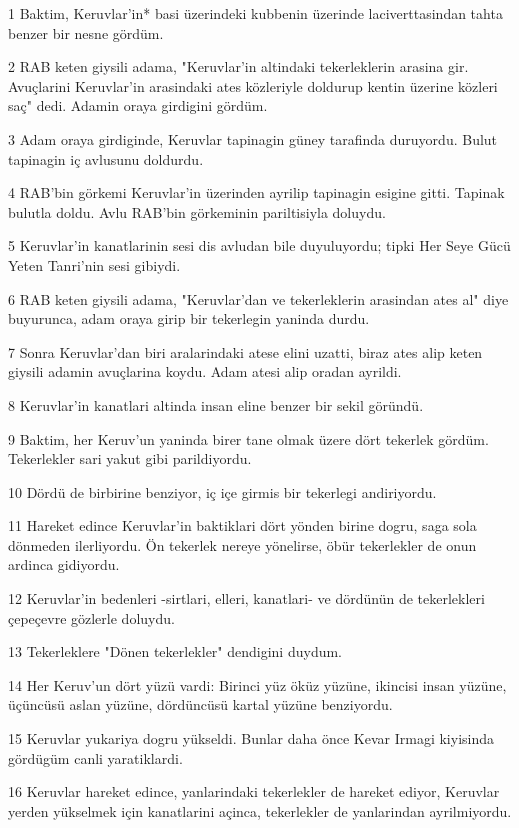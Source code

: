 \par 1 Baktim, Keruvlar'in* basi üzerindeki kubbenin üzerinde laciverttasindan tahta benzer bir nesne gördüm.
\par 2 RAB keten giysili adama, "Keruvlar'in altindaki tekerleklerin arasina gir. Avuçlarini Keruvlar'in arasindaki ates közleriyle doldurup kentin üzerine közleri saç" dedi. Adamin oraya girdigini gördüm.
\par 3 Adam oraya girdiginde, Keruvlar tapinagin güney tarafinda duruyordu. Bulut tapinagin iç avlusunu doldurdu.
\par 4 RAB'bin görkemi Keruvlar'in üzerinden ayrilip tapinagin esigine gitti. Tapinak bulutla doldu. Avlu RAB'bin görkeminin pariltisiyla doluydu.
\par 5 Keruvlar'in kanatlarinin sesi dis avludan bile duyuluyordu; tipki Her Seye Gücü Yeten Tanri'nin sesi gibiydi.
\par 6 RAB keten giysili adama, "Keruvlar'dan ve tekerleklerin arasindan ates al" diye buyurunca, adam oraya girip bir tekerlegin yaninda durdu.
\par 7 Sonra Keruvlar'dan biri aralarindaki atese elini uzatti, biraz ates alip keten giysili adamin avuçlarina koydu. Adam atesi alip oradan ayrildi.
\par 8 Keruvlar'in kanatlari altinda insan eline benzer bir sekil göründü.
\par 9 Baktim, her Keruv'un yaninda birer tane olmak üzere dört tekerlek gördüm. Tekerlekler sari yakut gibi parildiyordu.
\par 10 Dördü de birbirine benziyor, iç içe girmis bir tekerlegi andiriyordu.
\par 11 Hareket edince Keruvlar'in baktiklari dört yönden birine dogru, saga sola dönmeden ilerliyordu. Ön tekerlek nereye yönelirse, öbür tekerlekler de onun ardinca gidiyordu.
\par 12 Keruvlar'in bedenleri -sirtlari, elleri, kanatlari- ve dördünün de tekerlekleri çepeçevre gözlerle doluydu.
\par 13 Tekerleklere "Dönen tekerlekler" dendigini duydum.
\par 14 Her Keruv'un dört yüzü vardi: Birinci yüz öküz yüzüne, ikincisi insan yüzüne, üçüncüsü aslan yüzüne, dördüncüsü kartal yüzüne benziyordu.
\par 15 Keruvlar yukariya dogru yükseldi. Bunlar daha önce Kevar Irmagi kiyisinda gördügüm canli yaratiklardi.
\par 16 Keruvlar hareket edince, yanlarindaki tekerlekler de hareket ediyor, Keruvlar yerden yükselmek için kanatlarini açinca, tekerlekler de yanlarindan ayrilmiyordu.
